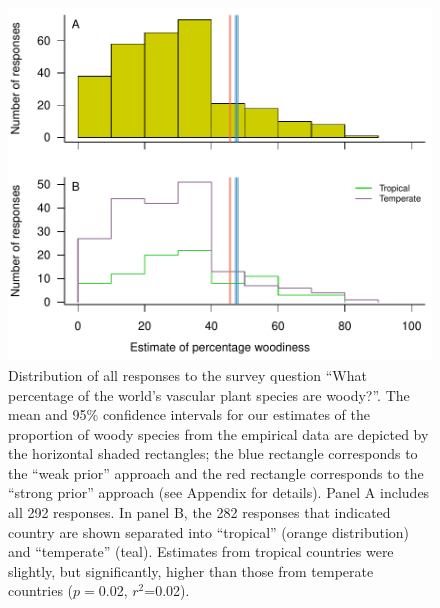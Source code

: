 \begin{figure}[p]
  \centering
  \includegraphics[width=\textwidth]{figs/survey-distribution}
  \caption[Distribution of survey responses]{Distribution of all
    responses to the survey question ``What percentage of the world's
    vascular plant species are woody?''.
    The mean and 95\% confidence intervals for our estimates of the
    proportion of woody species from the empirical data are depicted
    by the horizontal shaded rectangles; the blue rectangle
    corresponds to the ``weak prior'' approach and the red rectangle
    corresponds to the ``strong prior'' approach (see Appendix for
    details).  
    Panel A includes all 292 responses.  In panel B, the 282
    responses that indicated country are shown separated into
    ``tropical'' (orange distribution) and ``temperate'' (teal).
    Estimates from tropical countries were slightly, but
    significantly, higher than those from temperate countries
    ($p=$0.02, $r^2$=0.02).
  }

  \label{fig:survey-distribution}
\end{figure}

